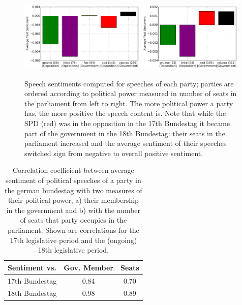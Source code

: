 \documentclass[runningheads,a4paper]{llncs}
\begin{document}
\begin{figure}
\begin{center}
\includegraphics[width=6cm]{images/party-sentiments-17.pdf}  \hfill \includegraphics[width=5cm]{images/party-sentiments-18.pdf} 
%
\end{center}
\caption{
\label{fig:party_sentiments}
Speech sentiments computed for speeches of each party; parties are ordered according to political power measured in number of seats in the parliament from left to right. The more political power a party has, the more positive the speech content is. Note that while the SPD (red) was in the opposition in the 17th Bundestag it became part of the government in the 18th Bundestag: their seats in the parliament increased and the average sentiment of their speeches switched sign from negative to overall positive sentiment.
}
\end{figure}

\begin{table}[t]
\begin{center}
\begin{tabular}{lcc}
   Sentiment vs. &          Gov. Member    &  Seats\\
\hline\hline
17th Bundestag    &  0.84 & 0.70\\
18th Bundestag   &  0.98 & 0.89\\
%
\end{tabular}
\end{center}
\caption{
\label{tab:sentiments}
Correlation coefficient between average sentiment of political speeches of a party in the german bundestag with two measures of their political power, a) their membership in the government and b) with the number of seats that party occupies in the parliament. Shown are correlations for the 17th legislative period and the (ongoing) 18th legislative period.
}
\end{table}
\end{document}
